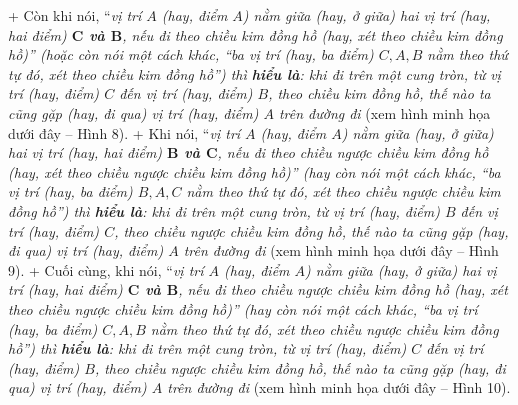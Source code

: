 	+ Còn khi nói, “\textit{vị trí $A$ (\textnormal{hay}, điểm $A$) nằm giữa (\textnormal{hay}, ở giữa) hai vị trí (\textnormal{hay}, hai điểm) \textbf{$\pmb C$ và $\pmb B$}, nếu đi theo chiều kim đồng hồ (\textnormal{hay}, xét theo chiều kim đồng hồ)” (\textnormal{hoặc còn} nói một cách khác, “ba vị trí (\textnormal{hay}, ba điểm) $C, A, B$ nằm theo thứ tự đó, xét theo chiều kim đồng hồ”) thì \textbf{hiểu là}: khi đi trên một cung tròn, từ vị trí (\textnormal{hay}, điểm) $C$ đến vị trí (\textnormal{hay}, điểm) $B$, theo chiều kim đồng hồ, thế nào ta cũng gặp (\textnormal{hay}, đi qua) vị trí (\textnormal{hay}, điểm) $A$ trên đường đi} (xem hình minh họa dưới đây -- Hình 8).
	\vskip 0.1cm
	+ Khi nói, “\textit{vị trí $A$ (\textnormal{hay}, điểm $A$) nằm giữa (\textnormal{hay}, ở giữa) hai vị trí (\textnormal{hay}, hai điểm) \textbf{$\pmb B$ và $\pmb C$}, nếu đi theo chiều ngược chiều kim đồng hồ (\textnormal{hay}, xét theo chiều ngược chiều kim đồng hồ)” (\textnormal{hay còn} nói một cách khác, “ba vị trí (\textnormal{hay}, ba điểm) $B, A, C$ nằm theo thứ tự đó, xét theo chiều ngược chiều kim đồng hồ”) thì \textbf{hiểu là}: khi đi trên một cung tròn, từ vị trí (\textnormal{hay}, điểm) $B$ đến vị trí (\textnormal{hay}, điểm) $C$, theo chiều ngược chiều kim đồng hồ, thế nào ta cũng gặp (\textnormal{hay}, đi qua) vị trí (\textnormal{hay}, điểm) $A$ trên đường đi} (xem hình minh họa dưới đây -- Hình 9).
	\vskip 0.1cm
	+ Cuối cùng, khi nói, “\textit{vị trí $A$ (\textnormal{hay}, điểm $A$) nằm giữa (\textnormal{hay}, ở giữa) hai vị trí (\textnormal{hay}, hai điểm) \textbf{$\pmb C$ và $\pmb B$}, nếu đi theo chiều ngược chiều kim đồng hồ (\textnormal{hay}, xét theo chiều ngược chiều kim đồng hồ)” (\textnormal{hay còn} nói một cách khác, “ba vị trí (\textnormal{hay}, ba điểm) $C, A, B$ nằm theo thứ tự đó, xét theo chiều ngược chiều kim đồng hồ”) thì \textbf{hiểu là}: khi đi trên một cung tròn, từ vị trí (\textnormal{hay}, điểm) $C$ đến vị trí (\textnormal{hay}, điểm) $B$, theo chiều ngược chiều kim đồng hồ, thế nào ta cũng gặp (\textnormal{hay}, đi qua) vị trí (\textnormal{hay}, điểm) $A$ trên đường đi} (xem hình minh họa dưới đây -- Hình 10).
